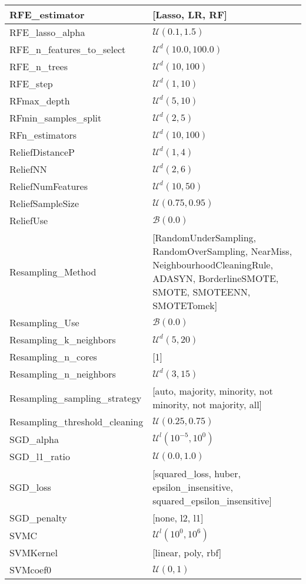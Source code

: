 \begin{table}[]
\begin{tabular}{l|l}
RFE\_estimator & {[Lasso, LR, RF]} \\ \hline
RFE\_lasso\_alpha & $\mathcal{U}(0.1, 1.5)$ \\ \hline
RFE\_n\_features\_to\_select & $\mathcal{U}^d(10.0, 100.0)$ \\ \hline
RFE\_n\_trees & $\mathcal{U}^d(10, 100)$ \\ \hline
RFE\_step & $\mathcal{U}^d(1, 10)$ \\ \hline
RFmax\_depth & $\mathcal{U}^d(5, 10)$ \\ \hline
RFmin\_samples\_split & $\mathcal{U}^d(2, 5)$ \\ \hline
RFn\_estimators & $\mathcal{U}^d(10, 100)$ \\ \hline
ReliefDistanceP & $\mathcal{U}^d(1, 4)$ \\ \hline
ReliefNN & $\mathcal{U}^d(2, 6)$ \\ \hline
ReliefNumFeatures & $\mathcal{U}^d(10, 50)$ \\ \hline
ReliefSampleSize & $\mathcal{U}(0.75, 0.95)$ \\ \hline
ReliefUse & $\mathcal{B}(0.0)$ \\ \hline
Resampling\_Method & {[RandomUnderSampling, RandomOverSampling, NearMiss, NeighbourhoodCleaningRule, ADASYN, BorderlineSMOTE, SMOTE, SMOTEENN, SMOTETomek]} \\ \hline
Resampling\_Use & $\mathcal{B}(0.0)$ \\ \hline
Resampling\_k\_neighbors & $\mathcal{U}^d(5, 20)$ \\ \hline
Resampling\_n\_cores & {[1]} \\ \hline
Resampling\_n\_neighbors & $\mathcal{U}^d(3, 15)$ \\ \hline
Resampling\_sampling\_strategy & {[auto, majority, minority, not minority, not majority, all]} \\ \hline
Resampling\_threshold\_cleaning & $\mathcal{U}(0.25, 0.75)$ \\ \hline
SGD\_alpha & $\mathcal{U}^l(10^{-5}, 10^{0})$ \\ \hline
SGD\_l1\_ratio & $\mathcal{U}(0.0, 1.0)$ \\ \hline
SGD\_loss & {[squared\_loss, huber, epsilon\_insensitive, squared\_epsilon\_insensitive]} \\ \hline
SGD\_penalty & {[none, l2, l1]} \\ \hline
SVMC & $\mathcal{U}^l(10^{0}, 10^{6})$ \\ \hline
SVMKernel & {[linear, poly, rbf]} \\ \hline
SVMcoef0 & $\mathcal{U}(0, 1)$ \\ \hline

\end{tabular}
\end{table}
